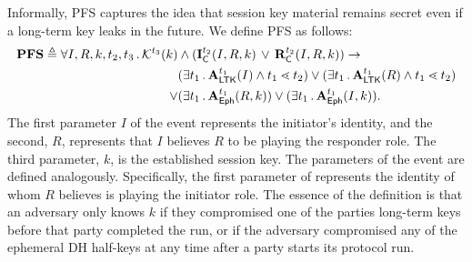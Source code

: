 \label{sec:secrecy}
%
Informally, PFS captures the idea that session key material remains secret
even if a long-term key leaks in the future.
%
%
We define PFS as follows: %
%
\begin{align*}
    \mathbf{PFS} \triangleq
    \forall I, R, k, t_2, t_3\operatorname{.}
    \mathcal{K}^{t_3}(k) & \land (\mathbf{I}_{\textsf{C}}^{t_2}(I, R, k)\, \lor\,  \mathbf{R}_{\textsf{C}}^{t_2}(I, R, k))
    \rightarrow\\
    &(\exists t_1\operatorname{.} \mathbf{A}_{\textsf{LTK}}^{t_1}(I) \land t_1 \lessdot t_2)
    \lor (\exists t_1\operatorname{.} \mathbf{A}_{\textsf{LTK}}^{t_1}(R) \land t_1 \lessdot t_2)\\
    \lor&(\exists t_1\operatorname{.} \mathbf{A}_{\textsf{Eph}}^{t_1}(R, k))
    \lor(\exists t_1\operatorname{.} \mathbf{A}_{\textsf{Eph}}^{t_1}(I, k)).
\end{align*}
%
The first parameter $I$ of the \mIComplete{} event represents the
initiator's identity,
and the second, $R$, represents that $I$ believes $R$ to be playing
the responder role.
%
The third parameter, $k$, is the established session key.
%
The parameters of the \mRComplete{} event are defined analogously.
%
Specifically, the first parameter of \mRComplete{} represents the identity of
whom $R$ believes is playing the initiator role.
%
%
The essence of the definition is that an adversary only knows $k$ if they
compromised one of the
parties long-term keys before that party completed the run, or if the adversary
compromised any of the ephemeral DH half-keys at any time after a party starts
its protocol run.

